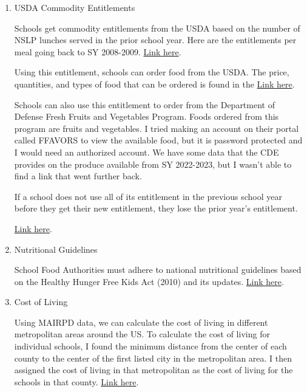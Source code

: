 \documentclass[12pt]{article}
\begin{document}
\begin{enumerate}
	\item USDA Commodity Entitlements 
	
	Schools get commodity entitlements from the USDA based on the number of NSLP lunches served in the prior school year. Here are the entitlements per meal going back to SY 2008-2009. \href{https://www.fns.usda.gov/usda-fis/value-donated-foods-notices}{Link here}.
	
	Using this entitlement, schools can order food from the USDA. The price, quantities, and types of food that can be ordered is found in the \href{https://agr.wa.gov/services/food-access/hunger-relief-agency-hub/federal-food-assistance-programs/ordering-and-distribution}{Link here}.
	
	Schools can also use this entitlement to order from the Department of Defense Fresh Fruits and Vegetables Program. Foods ordered from this program are fruits and vegetables. I tried making an account on their portal called FFAVORS to view the available food, but it is password protected and I would need an authorized account. We have some data that the CDE provides on the produce available from SY 2022-2023, but I wasn't able to find a link that went further back.
	
	If a school does not use all of its entitlement in the previous school year before they get their new entitlement, they lose the prior year's entitlement. 
	
	\href{https://www.cde.ca.gov/ls/nu/fd/dodofferingschlist.asp#allocation2021}{Link here}.
	
	\item Nutritional Guidelines

	School Food Authorities must adhere to national nutritional guidelines based on the Healthy Hunger Free Kids Act (2010) and its updates. 
	\href{https://www.govinfo.gov/content/pkg/FR-2012-01-26/pdf/2012-1010.pdf}{Link here}.
	
	\item Cost of Living
	
	Using MAIRPD data, we can calculate the cost of living in different metropolitan areas around the US. To calculate the cost of living for individual schools, I found the minimum distance from the center of each county to the center of the first listed city in the metropolitan area. I then assigned the cost of living in that metropolitan as the cost of living for the schools in that county. \href{https://apps.bea.gov/itable/?ReqID=70&step=1&_gl=1*1emw7ne*_ga*ODY3NzQ3NjE4LjE3MTIwMDYxMTc.*_ga_J4698JNNFT*MTcxMjAwNjExNi4xLjEuMTcxMjAwNjI0MC42MC4wLjA.#eyJhcHBpZCI6NzAsInN0ZXBzIjpbMSwyOSwyNSwzMV0sImRhdGEiOltbIlRhYmxlSWQiLCIxMDUiXSxbIk1ham9yX0FyZWEiLCI1Il1dfQ==}{Link here}.
	
\end{enumerate}
\end{document}
